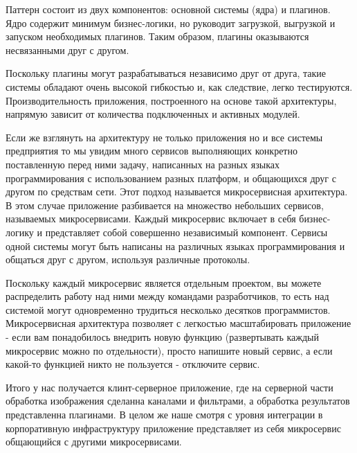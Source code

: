 Паттерн состоит из двух компонентов: основной системы (ядра) и плагинов. Ядро содержит минимум бизнес-логики, но руководит загрузкой, выгрузкой и запуском необходимых плагинов. Таким образом, плагины оказываются несвязанными друг с другом.

Поскольку плагины могут разрабатываться независимо друг от друга, такие системы обладают очень высокой гибкостью и, как следствие, легко тестируются. Производительность приложения, построенного на основе такой архитектуры, напрямую зависит от количества подключенных и активных модулей.

Если же взглянуть на архитектуру не только приложения но и все системы предприятия то мы увидим много сервисов выполняющих конкретно поставленную перед ними задачу, написанных на разных языках программирования с использованием разных платформ, и общающихся друг с другом по средствам сети. Этот подход называется микросервисная архитектура. В этом случае приложение разбивается на множество небольших сервисов, называемых микросервисами. Каждый микросервис включает в себя бизнес-логику и представляет собой совершенно независимый компонент. Сервисы одной системы могут быть написаны на различных языках программирования и общаться друг с другом, используя различные протоколы.

Поскольку каждый микросервис является отдельным проектом, вы можете распределить работу над ними между командами разработчиков, то есть над системой могут одновременно трудиться несколько десятков программистов. Микросервисная архитектура позволяет с легкостью масштабировать приложение - если вам понадобилось внедрить новую функцию (развертывать каждый микросервис можно по отдельности), просто напишите новый сервис, а если какой-то функцией никто не пользуется - отключите сервис.

Итого у нас получается клинт-серверное приложение, где на серверной части обработка изображения сделанна каналами и фильтрами, а обработка результатов представленна плагинами. В целом же наше смотря с уровня интеграции в корпоративную инфраструктуру приложение представляет из себя микросервис общающийся с другими микросервисами.